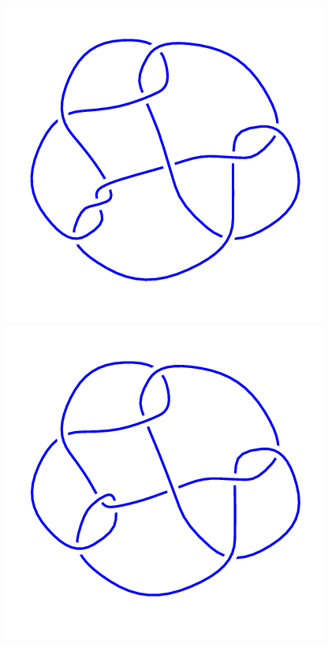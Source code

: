 \begin{figure}[H]
    \begin{minipage}[b]{.18\linewidth}
        \centering
        \includegraphics[width=\linewidth]{../data/10_72.png}
    \end{minipage}
    \begin{minipage}[b]{.18\linewidth}
        \centering
        \includegraphics[width=\linewidth]{../data/10_73.png}

\end{minipage}
\end{figure}
